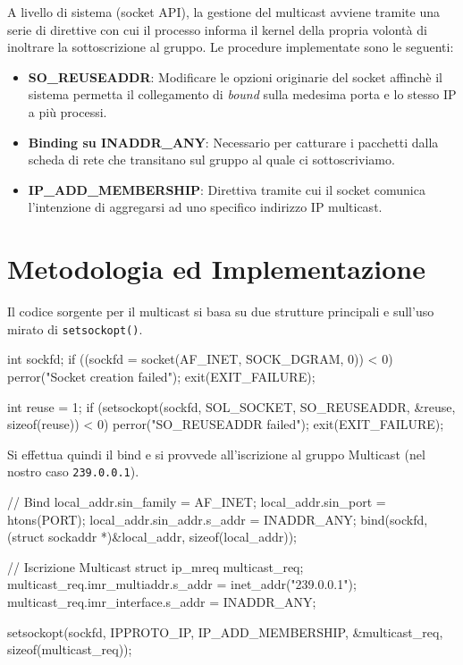 \documentclass[a4paper,12pt]{article}
\begin{document}
A livello di sistema (socket API), la gestione del multicast avviene tramite una serie di direttive con cui il processo informa il kernel della propria volontà di inoltrare la sottoscrizione al gruppo. Le procedure implementate sono le seguenti:
\begin{itemize}
    \item \textbf{SO\_REUSEADDR}: Modificare le opzioni originarie del socket affinchè il sistema permetta il collegamento di \textit{bound} sulla medesima porta e lo stesso IP a più processi.
    \item \textbf{Binding su INADDR\_ANY}: Necessario per catturare i pacchetti dalla scheda di rete che transitano sul gruppo al quale ci sottoscriviamo.
    \item \textbf{IP\_ADD\_MEMBERSHIP}: Direttiva tramite cui il socket comunica l'intenzione di aggregarsi ad uno specifico indirizzo IP multicast.
\end{itemize}

\section{Metodologia ed Implementazione}

Il codice sorgente per il multicast si basa su due strutture principali e sull'uso mirato di \texttt{setsockopt()}.

\begin{ccode}
int sockfd;
if ((sockfd = socket(AF_INET, SOCK_DGRAM, 0)) < 0) {
    perror("Socket creation failed");
    exit(EXIT_FAILURE);
}

int reuse = 1;
if (setsockopt(sockfd, SOL_SOCKET, SO_REUSEADDR, &reuse, sizeof(reuse)) < 0) {
    perror("SO_REUSEADDR failed");
    exit(EXIT_FAILURE);
}
\end{ccode}

Si effettua quindi il bind e si provvede all'iscrizione al gruppo Multicast (nel nostro caso \texttt{239.0.0.1}).
\begin{ccode}
// Bind
local_addr.sin_family = AF_INET;
local_addr.sin_port = htons(PORT);
local_addr.sin_addr.s_addr = INADDR_ANY;
bind(sockfd, (struct sockaddr *)&local_addr, sizeof(local_addr));

// Iscrizione Multicast
struct ip_mreq multicast_req;
multicast_req.imr_multiaddr.s_addr = inet_addr("239.0.0.1");
multicast_req.imr_interface.s_addr = INADDR_ANY;

setsockopt(sockfd, IPPROTO_IP, IP_ADD_MEMBERSHIP, &multicast_req, sizeof(multicast_req));
\end{ccode}
\end{document}
